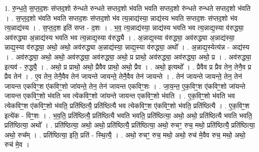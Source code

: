 \documentclass[17pt]{extarticle}
\begin{document}
1. रु॒न्ध॒ते॒ स॒प्त॒द॒शः स॑प्तद॒शो रु॑न्धते रुन्धते सप्तद॒शो भ॑वति भवति सप्तद॒शो रु॑न्धते रुन्धते सप्तद॒शो भ॑वति । . स॒प्त॒द॒शो भ॑वति भवति सप्तद॒शः स॑प्तद॒शो भ॑व त्य॒न्नाद्य॑स्या॒ न्नाद्य॑स्य भवति सप्तद॒शः स॑प्तद॒शो भ॑व त्य॒न्नाद्य॑स्य । . स॒प्त॒द॒श इति॑ सप्त - द॒शः । . भ॒व॒ त्य॒न्नाद्य॑स्या॒ न्नाद्य॑स्य भवति भव त्य॒न्नाद्य॒स्या व॑रुद्ध्या॒ अव॑रुद्ध्या अ॒न्नाद्य॑स्य भवति भव त्य॒न्नाद्य॒स्या व॑रुद्ध्यै । . अ॒न्नाद्य॒स्या व॑रुद्ध्या॒ अव॑रुद्ध्या अ॒न्नाद्य॑स्या॒ न्नाद्य॒स्या व॑रुद्ध्या॒ अथो॒ अथो॒ अव॑रुद्ध्या अ॒न्नाद्य॑स्या॒ न्नाद्य॒स्या व॑रुद्ध्या॒ अथो᳚ । . अ॒न्नाद्य॒स्येत्य॑न्न - अद्य॑स्य । . अव॑रुद्ध्या॒ अथो॒ अथो॒ अव॑रुद्ध्या॒ अव॑रुद्ध्या॒ अथो॒ प्र प्राथो॒ अव॑रुद्ध्या॒ अव॑रुद्ध्या॒ अथो॒ प्र । . अव॑रुद्ध्या॒ इत्यव॑ - रु॒द्ध्यै॒ । . अथो॒ प्र प्राथो॒ अथो॒ प्रैवैव प्राथो॒ अथो॒ प्रैव । . अथो॒ इत्यथो᳚ । . प्रैवैव प्र प्रैव तेन॒ तेनै॒व प्र प्रैव तेन॑ । . ए॒व तेन॒ तेनै॒वैव तेन॑ जायन्ते जायन्ते॒ तेनै॒वैव तेन॑ जायन्ते । . तेन॑ जायन्ते जायन्ते॒ तेन॒ तेन॑ जायन्त एकविꣳ॒॒श ए॑कविꣳ॒॒शो जा॑यन्ते॒ तेन॒ तेन॑ जायन्त एकविꣳ॒॒शः । . जा॒य॒न्त॒ ए॒क॒विꣳ॒॒श ए॑कविꣳ॒॒शो जा॑यन्ते जायन्त एकविꣳ॒॒शो भ॑वति भव त्येकविꣳ॒॒शो जा॑यन्ते जायन्त एकविꣳ॒॒शो भ॑वति । . ए॒क॒विꣳ॒॒शो भ॑वति भव त्येकविꣳ॒॒श ए॑कविꣳ॒॒शो भ॑वति॒ प्रति॑ष्ठित्यै॒ प्रति॑ष्ठित्यै भव त्येकविꣳ॒॒श ए॑कविꣳ॒॒शो भ॑वति॒ प्रति॑ष्ठित्यै । . ए॒क॒विꣳ॒॒श इत्ये॑क - विꣳ॒॒शः । . भ॒व॒ति॒ प्रति॑ष्ठित्यै॒ प्रति॑ष्ठित्यै भवति भवति॒ प्रति॑ष्ठित्या॒ अथो॒ अथो॒ प्रति॑ष्ठित्यै भवति भवति॒ प्रति॑ष्ठित्या॒ अथो᳚ । . प्रति॑ष्ठित्या॒ अथो॒ अथो॒ प्रति॑ष्ठित्यै॒ प्रति॑ष्ठित्या॒ अथो॒ रुचꣳ॒॒ रुच॒ मथो॒ प्रति॑ष्ठित्यै॒ प्रति॑ष्ठित्या॒ अथो॒ रुच᳚म् । . प्रति॑ष्ठित्या॒ इति॒ प्रति॑ - स्थि॒त्यै॒ । . अथो॒ रुचꣳ॒॒ रुच॒ मथो॒ अथो॒ रुच॑ मे॒वैव रुच॒ मथो॒ अथो॒ रुच॑ मे॒व । \newline
\end{document}
